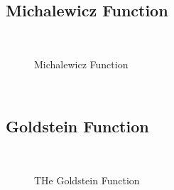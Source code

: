 \subsection{Michalewicz Function}
~
\begin{figure}[ht]
	\centering
	\setlength \fboxsep{0pt}
	\setlength \fboxrule{0.5pt}
	\caption{Michalewicz Function}
	\label{fig:MichalewiczGraph}
\end{figure}
~
\subsection{Goldstein Function}
~
\begin{figure}[ht]
	\centering
	\setlength \fboxsep{0pt}
	\setlength \fboxrule{0.5pt}
	\caption{THe Goldstein Function}
	\label{fig:GoldsteinGraph}
\end{figure}
~
